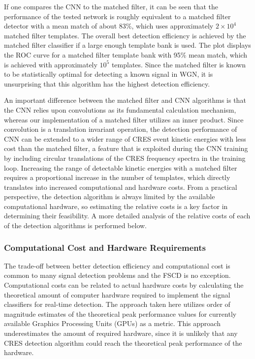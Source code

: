If one compares the CNN to the matched filter, it can be seen that the performance of the tested network is roughly equivalent to a matched filter detector with a mean match of about 83\%, which uses approximately $2\times10^4$ matched filter templates. The overall best detection efficiency is achieved by the matched filter classifier if a large enough template bank is used. The plot displays the ROC curve for a matched filter template bank with 95\% mean match, which is achieved with approximately $10^5$ templates. Since the matched filter is known to be statistically optimal for detecting a known signal in WGN, it is unsurprising that this algorithm has the highest detection efficiency.

An important difference between the matched filter and CNN algorithms is that the CNN relies upon convolutions as its fundamental calculation mechanism, whereas our implementation of a matched filter utilizes an inner product. Since convolution is a translation invariant operation, the detection performance of CNN can be extended to a wider range of CRES event kinetic energies with less cost than the matched filter, a feature that is exploited during the CNN training by including circular translations of the CRES frequency spectra in the training loop. Increasing the range of detectable kinetic energies with a matched filter requires a proportional increase in the number of templates, which directly translates into increased computational and hardware costs. From a practical perspective, the detection algorithm is always limited by the available computational hardware, so estimating the relative costs is a key factor in determining their feasibility. A more detailed analysis of the relative costs of each of the detection algorithms is performed below.


\subsubsection{Computational Cost and Hardware Requirements}
\label{sec:dis-comp-cost}


The trade-off between better detection efficiency and computational cost is common to many signal detection problems and the FSCD is no exception. Computational costs can be related to actual hardware costs by calculating the theoretical amount of computer hardware required to implement the signal classifiers for real-time detection. The approach taken here utilizes order of magnitude estimates of the theoretical peak performance values for currently available Graphics Processing Units (GPUs) as a metric. This approach underestimates the amount of required hardware, since it is unlikely that any CRES detection algorithm could reach the theoretical peak performance of the hardware. 

